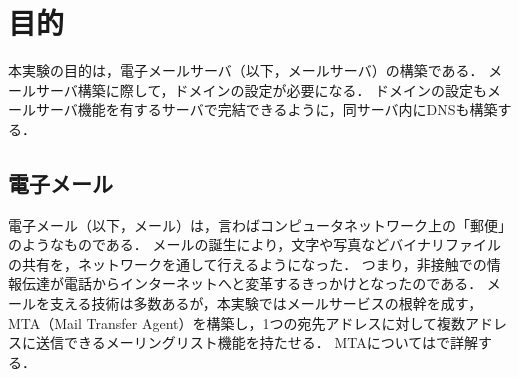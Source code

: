 \section{目的}
本実験の目的は，電子メールサーバ（以下，メールサーバ）の構築である．
メールサーバ構築に際して，ドメインの設定が必要になる．
ドメインの設定もメールサーバ機能を有するサーバで完結できるように，同サーバ内にDNSも構築する．
\subsection{電子メール}
電子メール（以下，メール）は，言わばコンピュータネットワーク上の「郵便」のようなものである．
メールの誕生により，文字や写真などバイナリファイルの共有を，ネットワークを通して行えるようになった．
つまり，非接触での情報伝達が電話からインターネットへと変革するきっかけとなったのである．
メールを支える技術は多数あるが，本実験ではメールサービスの根幹を成す，MTA（Mail Transfer Agent）を構築し，1つの宛先アドレスに対して複数アドレスに送信できるメーリングリスト機能を持たせる．
MTAについてはで詳解する．
